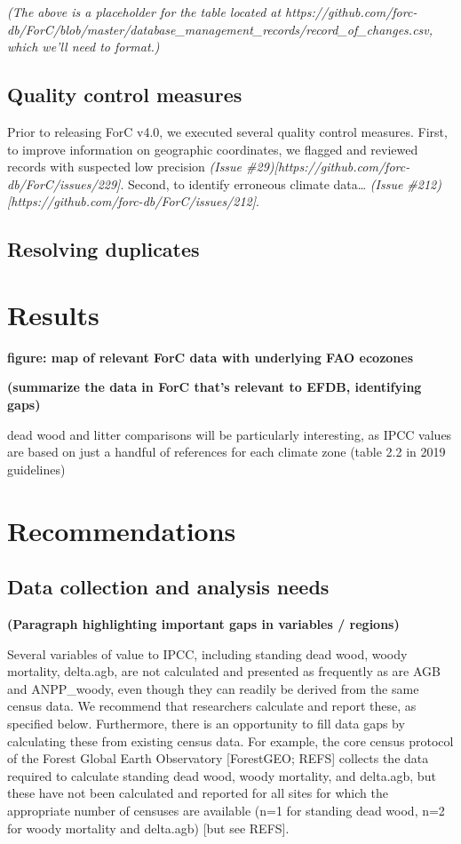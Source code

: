 \documentclass[, manuscript]{copernicus}
\begin{document}
\emph{(The above is a placeholder for the table located at
https://github.com/forc-db/ForC/blob/master/database\_management\_records/record\_of\_changes.csv,
which we'll need to format.)}

\subsection{Quality control measures}

Prior to releasing ForC v4.0, we executed several quality control
measures. First, to improve information on geographic coordinates, we
flagged and reviewed records with suspected low precision \emph{(Issue
\#29){[}https://github.com/forc-db/ForC/issues/229{]}}. Second, to
identify erroneous climate data\ldots{} \emph{(Issue
\#212){[}https://github.com/forc-db/ForC/issues/212{]}}.

\subsection{Resolving duplicates}

\section{Results}

\textbf{figure: map of relevant ForC data with underlying FAO ecozones}

\textbf{(summarize the data in ForC that's relevant to EFDB, identifying
gaps)}

dead wood and litter comparisons will be particularly interesting, as
IPCC values are based on just a handful of references for each climate
zone (table 2.2 in 2019 guidelines)

\section{Recommendations}

\subsection{Data collection and analysis needs}

\textbf{(Paragraph highlighting important gaps in variables / regions)}

Several variables of value to IPCC, including standing dead wood, woody
mortality, delta.agb, are not calculated and presented as frequently as
are AGB and ANPP\_woody, even though they can readily be derived from
the same census data. We recommend that researchers calculate and report
these, as specified below. Furthermore, there is an opportunity to fill
data gaps by calculating these from existing census data. For example,
the core census protocol of the Forest Global Earth Observatory
{[}ForestGEO; REFS{]} collects the data required to calculate standing
dead wood, woody mortality, and delta.agb, but these have not been
calculated and reported for all sites for which the appropriate number
of censuses are available (n=1 for standing dead wood, n=2 for woody
mortality and delta.agb) {[}but see REFS{]}.
\end{document}
